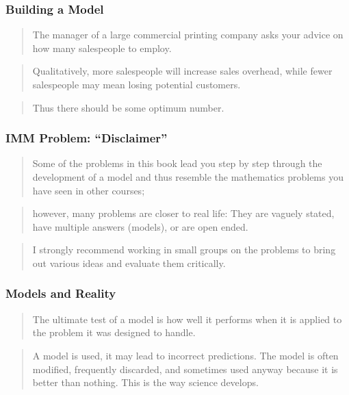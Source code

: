 \begin{frame}
    \frametitle{Building a Model}
    \begin{verse}
        The manager of a large commercial printing company 
        asks your advice on how many salespeople to employ.  
    \end{verse}
    \begin{verse}
        Qualitatively, more salespeople will increase sales overhead,
        while fewer salespeople may mean losing potential customers. 
    \end{verse}
    \begin{verse}
       Thus there should be some optimum number.
    \end{verse}
    
\end{frame}


\begin{frame}
    \frametitle{IMM Problem: ``Disclaimer''}
    \begin{verse}
        Some of the problems in this book lead you step by step through the
        development of a model and thus resemble the mathematics problems you have
        seen in other courses; 
    \end{verse} 
    \begin{verse} 
        however, many problems are closer to real life:
        They are vaguely stated, have multiple answers (models), or are open
        ended. 
    \end{verse}
    \begin{verse}
        I strongly recommend working in small groups on the problems to
        bring out various ideas and evaluate them critically.
    \end{verse}
\end{frame}

     
\begin{frame}
    \frametitle{Models and Reality}
    \begin{verse}
        The ultimate test of a model is how well it performs when 
        it is applied to the problem it was designed to handle.
    \end{verse}
    \vskip0.5in
    \begin{verse}
       A model is used, it may lead to incorrect predictions. The model is
       often modified, frequently discarded, and sometimes used anyway because
       it is better than nothing. This is the way science develops.  
    \end{verse}
\end{frame}





